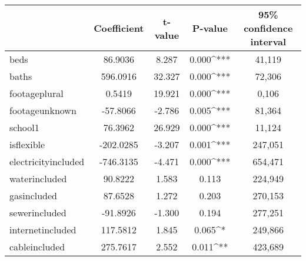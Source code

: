 \documentclass[12pt]{report}
\begin{document}
\begin{table}[h]
	\centering
	\begin{tabular}{l S[table-format=3.4] S[table-format=3.4] S[table-format=3.4] S[table-format=3.4]}
		\hline\hline
		                                                 & \textbf{Coefficient} & \textbf{t-value} & \textbf{P-value} & \textbf{95\% confidence interval} \\ \hline
		beds                                             & 86.9036              & 8.287            & 0.000^{***}      & 41,119                            \\
		baths                                            & 596.0916             & 32.327           & 0.000^{***}      & 72,306                            \\
		footageplural                                    & 0.5419               & 19.921           & 0.000^{***}      & 0,106                             \\
		footageunknown                                   & -57.8066             & -2.786           & 0.005^{***}      & 81,364                            \\
		school1                                          & 76.3962              & 26.929           & 0.000^{***}      & 11,124                            \\
		is\textunderscore flexible                       & -202.0285            & -3.207           & 0.001^{***}      & 247,051                           \\
		electricityincluded                              & -746.3135            & -4.471           & 0.000^{***}      & 654,471                           \\
		waterincluded                                    & 90.8222              & 1.583            & 0.113            & 224,949                           \\
		gasincluded                                      & 87.6528              & 1.272            & 0.203            & 270,153                           \\
		sewerincluded                                    & -91.8926             & -1.300           & 0.194            & 277,251                           \\
		internetincluded                                 & 117.5812             & 1.845            & 0.065^{*}        & 249,866                           \\
		cableincluded                                    & 275.7617             & 2.552            & 0.011^{**}       & 423,689                           \\

\end{tabular}
\end{table}
\end{document}
